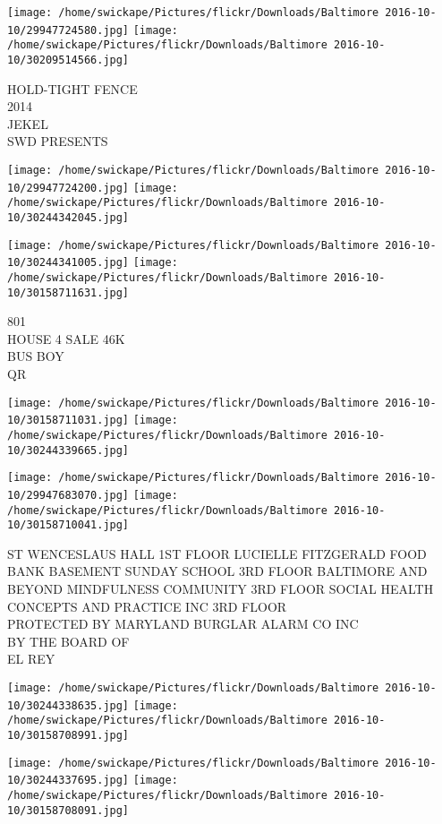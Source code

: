 \documentclass[10pt,letterpaper]{article}
\begin{document}
\texttt{[image: /home/swickape/Pictures/flickr/Downloads/Baltimore 2016-10-10/29947724580.jpg]}
\texttt{[image: /home/swickape/Pictures/flickr/Downloads/Baltimore 2016-10-10/30209514566.jpg]}

HOLD{-}TIGHT FENCE\\
2014\\
JEKEL\\
SWD PRESENTS
\pagebreak

\texttt{[image: /home/swickape/Pictures/flickr/Downloads/Baltimore 2016-10-10/29947724200.jpg]}
\texttt{[image: /home/swickape/Pictures/flickr/Downloads/Baltimore 2016-10-10/30244342045.jpg]}

\texttt{[image: /home/swickape/Pictures/flickr/Downloads/Baltimore 2016-10-10/30244341005.jpg]}
\texttt{[image: /home/swickape/Pictures/flickr/Downloads/Baltimore 2016-10-10/30158711631.jpg]}

801\\
HOUSE 4 SALE 46K\\
BUS BOY\\
QR
\pagebreak

\texttt{[image: /home/swickape/Pictures/flickr/Downloads/Baltimore 2016-10-10/30158711031.jpg]}
\texttt{[image: /home/swickape/Pictures/flickr/Downloads/Baltimore 2016-10-10/30244339665.jpg]}

\texttt{[image: /home/swickape/Pictures/flickr/Downloads/Baltimore 2016-10-10/29947683070.jpg]}
\texttt{[image: /home/swickape/Pictures/flickr/Downloads/Baltimore 2016-10-10/30158710041.jpg]}

ST WENCESLAUS HALL 1ST FLOOR LUCIELLE FITZGERALD FOOD BANK BASEMENT SUNDAY SCHOOL 3RD FLOOR BALTIMORE AND BEYOND MINDFULNESS COMMUNITY 3RD FLOOR SOCIAL HEALTH CONCEPTS AND PRACTICE INC 3RD FLOOR\\
PROTECTED BY MARYLAND BURGLAR ALARM CO INC\\
BY THE BOARD OF\\
EL REY
\pagebreak

\texttt{[image: /home/swickape/Pictures/flickr/Downloads/Baltimore 2016-10-10/30244338635.jpg]}
\texttt{[image: /home/swickape/Pictures/flickr/Downloads/Baltimore 2016-10-10/30158708991.jpg]}

\texttt{[image: /home/swickape/Pictures/flickr/Downloads/Baltimore 2016-10-10/30244337695.jpg]}
\texttt{[image: /home/swickape/Pictures/flickr/Downloads/Baltimore 2016-10-10/30158708091.jpg]}
\end{document}
